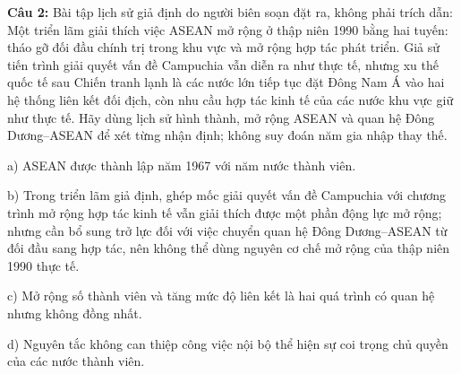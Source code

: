 \documentclass[12pt,a4paper]{article}
\begin{document}
\par\noindent\begin{minipage}{\linewidth}
\noindent\textbf{Câu 2:} Bài tập lịch sử giả định do người biên soạn đặt ra, không phải trích dẫn: Một triển lãm giải thích việc ASEAN mở rộng ở thập niên 1990 bằng hai tuyến: tháo gỡ đối đầu chính trị trong khu vực và mở rộng hợp tác phát triển. Giả sử tiến trình giải quyết vấn đề Campuchia vẫn diễn ra như thực tế, nhưng xu thế quốc tế sau Chiến tranh lạnh là các nước lớn tiếp tục đặt Đông Nam Á vào hai hệ thống liên kết đối địch, còn nhu cầu hợp tác kinh tế của các nước khu vực giữ như thực tế. Hãy dùng lịch sử hình thành, mở rộng ASEAN và quan hệ Đông Dương--ASEAN để xét từng nhận định; không suy đoán năm gia nhập thay thế.\par
\noindent a) ASEAN được thành lập năm 1967 với năm nước thành viên.\par
\noindent b) Trong triển lãm giả định, ghép mốc giải quyết vấn đề Campuchia với chương trình mở rộng hợp tác kinh tế vẫn giải thích được một phần động lực mở rộng; nhưng cần bổ sung trở lực đối với việc chuyển quan hệ Đông Dương--ASEAN từ đối đầu sang hợp tác, nên không thể dùng nguyên cơ chế mở rộng của thập niên 1990 thực tế.\par
\noindent c) Mở rộng số thành viên và tăng mức độ liên kết là hai quá trình có quan hệ nhưng không đồng nhất.\par
\noindent d) Nguyên tắc không can thiệp công việc nội bộ thể hiện sự coi trọng chủ quyền của các nước thành viên.\par
\end{minipage}\par\vspace{0.12cm}
\end{document}
